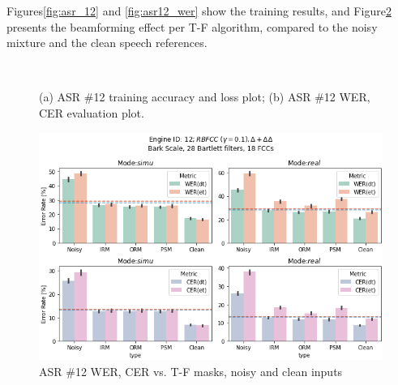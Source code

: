 Figures\;\ref{fig:asr_12} and \;\ref{fig:asr12_wer} show
the training results, and Figure\;\ref{fig:asr12_wer_masks}
presents the beamforming effect per T-F algorithm, compared to 
the noisy mixture and the clean speech references.
\begin{figure}[H]
    \centering
    \\
    \vspace{-0.3cm}
    \caption{(a) ASR \#12 training accuracy and loss plot;\;\;
        (b) ASR \#12 WER, CER evaluation plot.}\label{fig:asr12_wer_subplot} 
\end{figure}

\begin{figure}[H]
    \centering
    \includegraphics[width=0.95\linewidth]{ASR/images/asr12_wer_masks.png}
    \caption{ASR \#12 WER, CER vs. T-F masks, noisy and clean inputs }\label{fig:asr12_wer_masks}
\end{figure}


